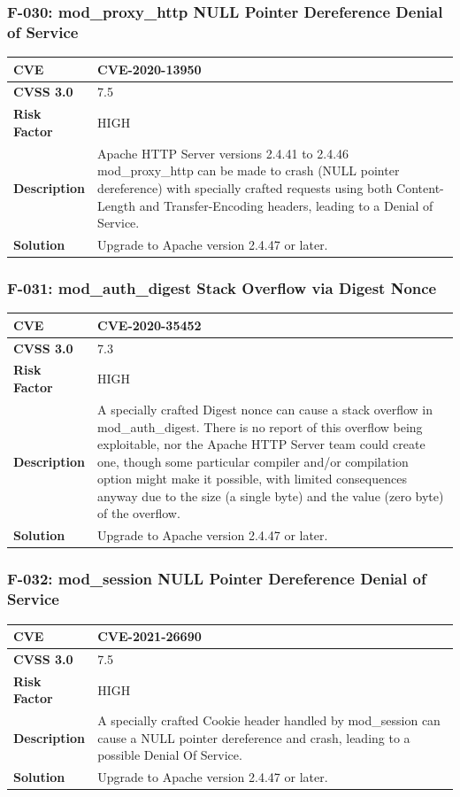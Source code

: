 \subsubsection{F-030: mod\_proxy\_http NULL Pointer Dereference Denial of Service}
\begin{tabular}{|p{2.8cm}|p{12.2cm}|}
\hline
\textbf{CVE} & CVE-2020-13950 \\ \hline
\textbf{CVSS 3.0} & 7.5 \\ \hline
\textbf{Risk Factor} & HIGH \\ \hline
\textbf{Description} & Apache HTTP Server versions 2.4.41 to 2.4.46 mod\_proxy\_http can be made to crash (NULL pointer dereference) with specially crafted requests using both Content-Length and Transfer-Encoding headers, leading to a Denial of Service. \\ \hline
\textbf{Solution} & Upgrade to Apache version 2.4.47 or later. \\ \hline
\end{tabular}

\subsubsection{F-031: mod\_auth\_digest Stack Overflow via Digest Nonce}
\begin{tabular}{|p{2.8cm}|p{12.2cm}|}
\hline
\textbf{CVE} & CVE-2020-35452 \\ \hline
\textbf{CVSS 3.0} & 7.3 \\ \hline
\textbf{Risk Factor} & HIGH \\ \hline
\textbf{Description} & A specially crafted Digest nonce can cause a stack overflow in mod\_auth\_digest. There is no report of this overflow being exploitable, nor the Apache HTTP Server team could create one, though some particular compiler and/or compilation option might make it possible, with limited consequences anyway due to the size (a single byte) and the value (zero byte) of the overflow. \\ \hline
\textbf{Solution} & Upgrade to Apache version 2.4.47 or later. \\ \hline
\end{tabular}

\subsubsection{F-032: mod\_session NULL Pointer Dereference Denial of Service}
\begin{tabular}{|p{2.8cm}|p{12.2cm}|}
\hline
\textbf{CVE} & CVE-2021-26690 \\ \hline
\textbf{CVSS 3.0} & 7.5 \\ \hline
\textbf{Risk Factor} & HIGH \\ \hline
\textbf{Description} & A specially crafted Cookie header handled by mod\_session can cause a NULL pointer dereference and crash, leading to a possible Denial Of Service. \\ \hline
\textbf{Solution} & Upgrade to Apache version 2.4.47 or later. \\ \hline
\end{tabular}

